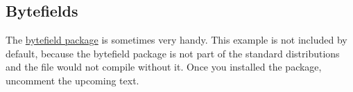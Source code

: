\subsection{Bytefields}
%
The 
\href{http://www.ctan.org/tex-archive/macros/latex/contrib/bytefield/}
{bytefield package} is sometimes very handy.
This example is not included by default, because the bytefield package is
not part of the standard distributions and the file would
not compile without it.
Once you installed the package, uncomment the upcoming text.
%
